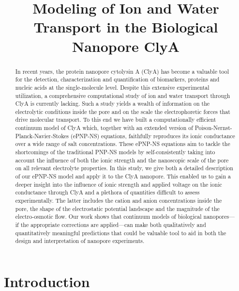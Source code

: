\documentclass[journal=ancac3,manuscript=article,etalmode=truncate,maxauthors=0,layout=onecolumn]{achemso}
\title{Modeling of Ion and Water Transport in the Biological Nanopore ClyA}
\begin{document}
\begin{tocentry}
\end{tocentry}



\begin{abstract}
  \footnotesize
  In recent years, the protein nanopore cytolysin A (ClyA) has become a valuable tool for the detection,
  characterization and quantification of biomarkers, proteins and nucleic acids at the single-molecule level.
  Despite this extensive experimental utilization, a comprehensive computational study of ion and water
  transport through ClyA is currently lacking. Such a study yields a wealth of information on the electrolytic
  conditions inside the pore and on the scale the electrophoretic forces that drive molecular transport. To
  this end we have built a computationally efficient continuum model of ClyA which, together with an extended
  version of Poison-Nernst-Planck-Navier-Stokes (ePNP-NS) equations, faithfully reproduces its ionic
  conductance over a wide range of salt concentrations. These ePNP-NS equations aim to tackle the shortcomings
  of the traditional PNP-NS models by self-consistently taking into account the influence of both the ionic
  strength and the nanoscopic scale of the pore on all relevant electrolyte properties. In this study, we give
  both a detailed description of our ePNP-NS model and apply it to the ClyA nanopore. This enabled us to gain
  a deeper insight into the influence of ionic strength and applied voltage on the ionic conductance through
  ClyA and a plethora of quantities difficult to assess experimentally. The latter includes the cation and
  anion concentrations inside the pore, the shape of the electrostatic potential landscape and the magnitude
  of the electro-osmotic flow. Our work shows that continuum models of biological nanopores---if the
  appropriate corrections are applied---can make both qualitatively and quantitatively meaningful predictions
  that could be valuable tool to aid in both the design and interpretation of nanopore experiments.
\end{abstract}


\section{Introduction}
\end{document}
